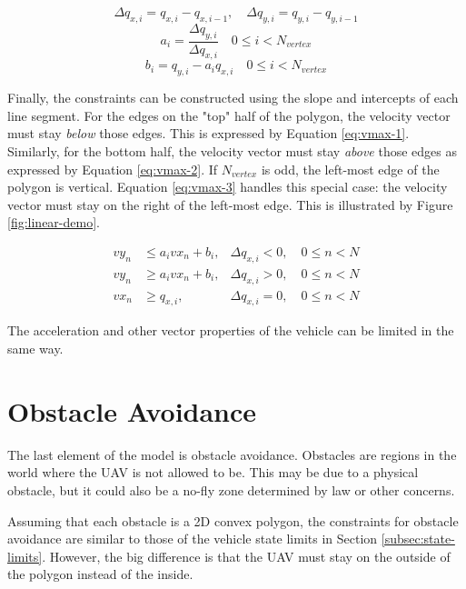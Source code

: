 \begin{equation}
\label{eq:lin-delta}
\Delta q_{x,i} = q_{x,i} - q_{x,i-1}, \quad \Delta q_{y,i} = q_{y,i} - q_{y,i-1}
\end{equation}
\begin{equation}
\label{eq:lin-a}
a_i = \dfrac{\Delta q_{y,i}}{\Delta q_{x,i}} \quad 0 \leq i < N_{vertex}
\end{equation}
\begin{equation}
\label{eq:lin-b}
b_i = q_{y,i} - a_i q_{x,i}  \quad 0 \leq i < N_{vertex}
\end{equation}




Finally, the constraints can be constructed using the slope and intercepts of each line segment. For the edges on the "top" half of the polygon, the velocity vector must stay \emph{below} those edges. This is expressed by Equation \ref{eq:vmax-1}. Similarly, for the bottom half, the velocity vector must stay \emph{above} those edges as expressed by Equation \ref{eq:vmax-2}. If $N_{vertex}$ is odd, the left-most edge of the polygon is vertical. Equation \ref{eq:vmax-3} handles this special case: the velocity vector must stay on the right of the left-most edge. This is illustrated by Figure \ref{fig:linear-demo}.



\begin{align}
vy_{n} &\leq a_i vx_{n} + b_i,  & \Delta q_{x,i} < 0, \quad 0 \leq n < N  \label{eq:vmax-1} \\
vy_{n} &\geq a_i vx_{n} + b_i,  & \Delta q_{x,i} > 0, \quad 0 \leq n < N \label{eq:vmax-2} \\
vx_{n} &\geq q_{x,i},  & \Delta q_{x,i} = 0, \quad 0 \leq n < N \label{eq:vmax-3}
\end{align}

The acceleration and other vector properties of the vehicle can be limited in the same way. 

\section{Obstacle Avoidance}
\label{subsec:obs-avoid}

The last element of the model is obstacle avoidance. Obstacles are regions in the world where the UAV is not allowed to be. This may be due to a physical obstacle, but it could also be a no-fly zone determined by law or other concerns. \par
Assuming that each obstacle is a 2D convex polygon, the constraints for obstacle avoidance are similar to those of the vehicle state limits in Section \ref{subsec:state-limits}. However, the big difference is that the UAV must stay on the outside of the polygon instead of the inside.

